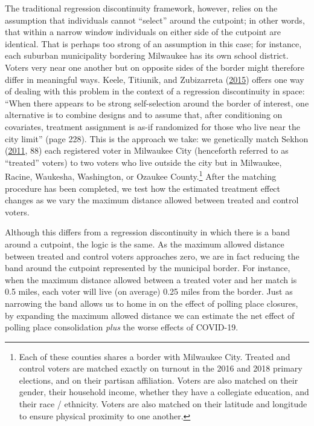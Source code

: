 \documentclass[
  12pt,
]{article}
\begin{document}
The traditional regression discontinuity framework, however, relies on the assumption that individuals cannot ``select'' around the cutpoint; in other words, that within a narrow window individuals on either side of the cutpoint are identical. That is perhaps too strong of an assumption in this case; for instance, each suburban municipality bordering Milwaukee has its own school district. Voters very near one another but on opposite sides of the border might therefore differ in meaningful ways. Keele, Titiunik, and Zubizarreta (\protect\hyperlink{ref-Keele2015}{2015}) offers one way of dealing with this problem in the context of a regression discontinuity in space: ``When there appears to be strong self-selection around the border of interest, one alternative is to combine designs and to assume that, after conditioning on covariates, treatment assignment is as-if randomized for those who live near the city limit'' (page 228). This is the approach we take: we genetically match Sekhon (\protect\hyperlink{ref-Sekhon2011}{2011}, 88) each registered voter in Milwaukee City (henceforth referred to as ``treated'' voters) to two voters who live outside the city but in Milwaukee, Racine, Waukesha, Washington, or Ozaukee County.\footnote{Each of these counties shares a border with Milwaukee City. Treated and control voters are matched exactly on turnout in the 2016 and 2018 primary elections, and on their partisan affiliation. Voters are also matched on their gender, their household income, whether they have a collegiate education, and their race / ethnicity. Voters are also matched on their latitude and longitude to ensure physical proximity to one another.} After the matching procedure has been completed, we test how the estimated treatment effect changes as we vary the maximum distance allowed between treated and control voters.

Although this differs from a regression discontinuity in which there is a band around a cutpoint, the logic is the same. As the maximum allowed distance between treated and control voters approaches zero, we are in fact reducing the band around the cutpoint represented by the municipal border. For instance, when the maximum distance allowed between a treated voter and her match is 0.5 miles, each voter will live (on average) 0.25 miles from the border. Just as narrowing the band allows us to home in on the effect of polling place closures, by expanding the maximum allowed distance we can estimate the net effect of polling place consolidation \emph{plus} the worse effects of COVID-19.
\end{document}
